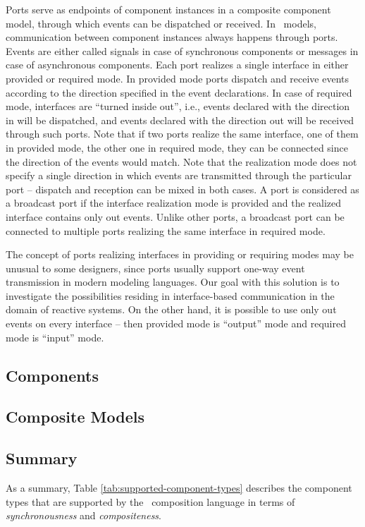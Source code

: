 Ports serve as endpoints of component instances in a composite component model,
through which events can be dispatched or received. In \gamma\ models, communication between component
instances always happens through ports. Events are either called signals in case of
synchronous components or messages in case of asynchronous components. Each port realizes
a single interface in either provided or required mode. In provided mode ports dispatch and receive events according to the direction specified in the event declarations. In case of required mode, interfaces are ``turned inside out'', i.e., events declared with the direction in will be
dispatched, and events declared with the direction out will be received through such ports. Note that if two ports realize the same interface, one of them in provided mode, the other
one in required mode, they can be connected since the direction of the events would match. Note that
the realization mode does not specify a single direction in which events are transmitted
through the particular port – dispatch and reception can be mixed in both cases. A port is considered as a broadcast port if the interface realization mode is provided and
the realized interface contains only out events. Unlike other ports, a broadcast port can
be connected to multiple ports realizing the same interface in required mode.

The concept of ports realizing interfaces in providing or requiring modes may be unusual to
some designers, since ports usually support one-way event transmission in modern modeling
languages. Our goal with this solution is to investigate the possibilities residing in interface-based
communication in the domain of reactive systems. On the other hand, it is possible to
use only out events on every interface -- then provided mode is ``output'' mode and required
mode is ``input'' mode.


\subsection{Components}

\subsection{Composite Models}

\subsection{Summary}
As a summary, Table \ref{tab:supported-component-types} describes the component types that are supported by the \gamma\ composition language in terms of \emph{synchronousness} and \emph{compositeness}.

